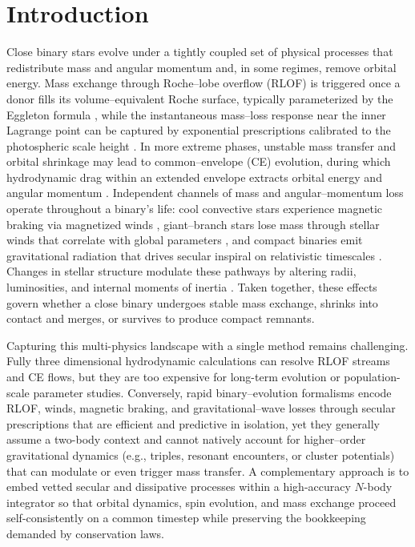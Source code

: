 \documentclass[11pt]{article}
\begin{document}
\section{Introduction}\label{sec:intro}
Close binary stars evolve under a tightly coupled set of physical processes that redistribute mass and angular momentum and, in some regimes, remove orbital energy. Mass exchange through Roche–lobe overflow (RLOF) is triggered once a donor fills its volume–equivalent Roche surface, typically parameterized by the Eggleton formula \citep{Eggleton1983}, while the instantaneous mass–loss response near the inner Lagrange point can be captured by exponential prescriptions calibrated to the photospheric scale height \citep{Ritter1988}. In more extreme phases, unstable mass transfer and orbital shrinkage may lead to common–envelope (CE) evolution, during which hydrodynamic drag within an extended envelope extracts orbital energy and angular momentum \citep{Ostriker1999}. Independent channels of mass and angular–momentum loss operate throughout a binary’s life: cool convective stars experience magnetic braking via magnetized winds \citep{Verbunt1981,Kawaler1988}, giant–branch stars lose mass through stellar winds that correlate with global parameters \citep{Reimers1975}, and compact binaries emit gravitational radiation that drives secular inspiral on relativistic timescales \citep{Peters1964}. Changes in stellar structure modulate these pathways by altering radii, luminosities, and internal moments of inertia \citep{Hurley2000}. Taken together, these effects govern whether a close binary undergoes stable mass exchange, shrinks into contact and merges, or survives to produce compact remnants.

Capturing this multi-physics landscape with a single method remains challenging. Fully three dimensional hydrodynamic calculations can resolve RLOF streams and CE flows, but they are too expensive for long-term evolution or population-scale parameter studies. Conversely, rapid binary–evolution formalisms encode RLOF, winds, magnetic braking, and gravitational–wave losses through secular prescriptions that are efficient and predictive in isolation, yet they generally assume a two-body context and cannot natively account for higher–order gravitational dynamics (e.g., triples, resonant encounters, or cluster potentials) that can modulate or even trigger mass transfer. A complementary approach is to embed vetted secular and dissipative processes within a high-accuracy $N$-body integrator so that orbital dynamics, spin evolution, and mass exchange proceed self-consistently on a common timestep while preserving the bookkeeping demanded by conservation laws.
\end{document}
